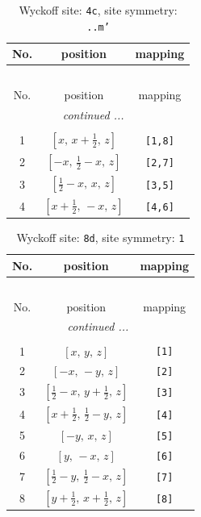 \documentclass[fleqn,8pt]{jsarticle}
\begin{document}
\begin{longtable}{ccc}
\caption{Wyckoff site: {\tt 4c}, site symmetry: {\tt ..m'}}
 \\
 \hline \hline
No. & position & mapping \\ \hline \endfirsthead

\multicolumn{2}{l}{\tablename\ \thetable{}} \\
 \hline \hline
No. & position & mapping \\ \hline \endhead

 \hline \hline
\multicolumn{2}{r}{\footnotesize\it continued ...} \\ \endfoot

 \hline \hline
\multicolumn{2}{r}{} \\ \endlastfoot

1 & $\left[ x,\, x + \frac{1}{2},\, z \right]$ & {\tt [1,8]} \\ \hline
2 & $\left[ - x,\, \frac{1}{2} - x,\, z \right]$ & {\tt [2,7]} \\ \hline
3 & $\left[ \frac{1}{2} - x,\, x,\, z \right]$ & {\tt [3,5]} \\ \hline
4 & $\left[ x + \frac{1}{2},\, - x,\, z \right]$ & {\tt [4,6]} \\
\end{longtable}
\renewcommand{\arraystretch}{1.2}
\begin{longtable}{ccc}
\caption{Wyckoff site: {\tt 8d}, site symmetry: {\tt 1}}
 \\
 \hline \hline
No. & position & mapping \\ \hline \endfirsthead

\multicolumn{2}{l}{\tablename\ \thetable{}} \\
 \hline \hline
No. & position & mapping \\ \hline \endhead

 \hline \hline
\multicolumn{2}{r}{\footnotesize\it continued ...} \\ \endfoot

 \hline \hline
\multicolumn{2}{r}{} \\ \endlastfoot

1 & $\left[ x,\, y,\, z \right]$ & {\tt [1]} \\ \hline
2 & $\left[ - x,\, - y,\, z \right]$ & {\tt [2]} \\ \hline
3 & $\left[ \frac{1}{2} - x,\, y + \frac{1}{2},\, z \right]$ & {\tt [3]} \\ \hline
4 & $\left[ x + \frac{1}{2},\, \frac{1}{2} - y,\, z \right]$ & {\tt [4]} \\ \hline
5 & $\left[ - y,\, x,\, z \right]$ & {\tt [5]} \\ \hline
6 & $\left[ y,\, - x,\, z \right]$ & {\tt [6]} \\ \hline
7 & $\left[ \frac{1}{2} - y,\, \frac{1}{2} - x,\, z \right]$ & {\tt [7]} \\ \hline
8 & $\left[ y + \frac{1}{2},\, x + \frac{1}{2},\, z \right]$ & {\tt [8]} \\
\end{longtable}
\end{document}
